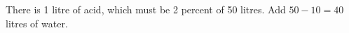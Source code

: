 There is 1 litre of acid, which must be 2 percent of 50 litres. Add $50-10=\boxed{40}$ litres of water.
